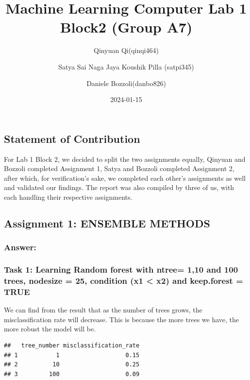 \documentclass[
]{article}
\title{Machine Learning Computer Lab 1 Block2 (Group A7)}
\author{Qinyuan Qi(qinqi464) \and Satya Sai Naga Jaya Koushik Pilla
(satpi345) \and Daniele Bozzoli(danbo826)}
\date{2024-01-15}
\begin{document}
\maketitle

\hypertarget{statement-of-contribution}{%
\subsection{Statement of Contribution}\label{statement-of-contribution}}

For Lab 1 Block 2, we decided to split the two assignments equally,
Qinyuan and Bozzoli completed Assignment 1, Satya and Bozzoli completed
Assignment 2, after which, for verification's sake, we completed each
other's assignments as well and validated our findings. The report was
also compiled by three of us, with each handling their respective
assignments.

\hypertarget{assignment-1-ensemble-methods}{%
\subsection{Assignment 1: ENSEMBLE
METHODS}\label{assignment-1-ensemble-methods}}

\hypertarget{answer}{%
\subsubsection{Answer:}\label{answer}}

\hypertarget{task-1-learning-random-forest-with-ntree-110-and-100-trees-nodesize-25-condition-x1-x2-and-keep.forest-true}{%
\subsubsection{Task 1: Learning Random forest with ntree= 1,10 and 100
trees, nodesize = 25, condition (x1 \textless{} x2) and keep.forest =
TRUE}\label{task-1-learning-random-forest-with-ntree-110-and-100-trees-nodesize-25-condition-x1-x2-and-keep.forest-true}}

We can find from the result that as the number of trees grows, the
misclassification rate will decrease. This is because the more trees we
have, the more robust the model will be.

\begin{verbatim}
##   tree_number misclassification_rate
## 1           1                   0.15
## 2          10                   0.25
## 3         100                   0.09
\end{verbatim}
\end{document}
